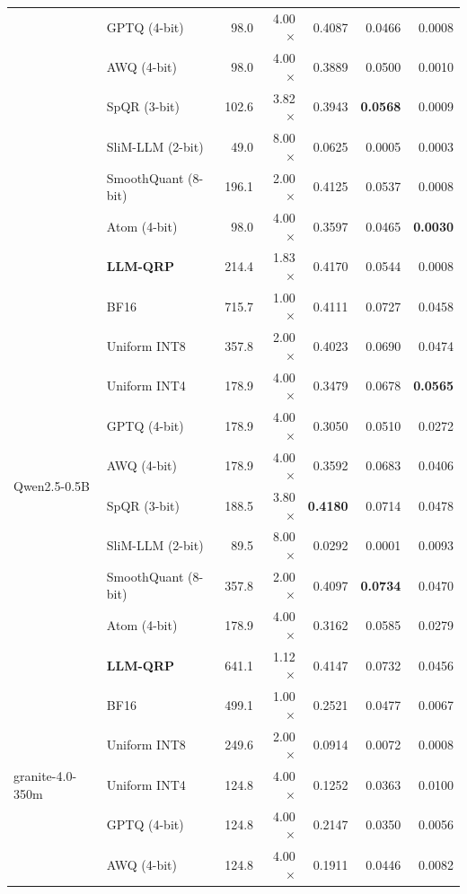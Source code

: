 \documentclass{article}
\begin{document}
\begin{table}[htbp]
\begin{tabular}{@{} l l rr rrr @{}}
     & GPTQ (4-bit) & 98.0 & 4.00$\times$ & 0.4087 & 0.0466 & 0.0008 \\
     & AWQ (4-bit) & 98.0 & 4.00$\times$ & 0.3889 & 0.0500 & 0.0010 \\
     & SpQR (3-bit) & 102.6 & 3.82$\times$ & 0.3943 & \textbf{0.0568} & 0.0009 \\
     & SliM-LLM (2-bit) & 49.0 & 8.00$\times$ & 0.0625 & 0.0005 & 0.0003 \\
     & SmoothQuant (8-bit) & 196.1 & 2.00$\times$ & 0.4125 & 0.0537 & 0.0008 \\
     & Atom (4-bit) & 98.0 & 4.00$\times$ & 0.3597 & 0.0465 & \textbf{0.0030} \\
     & \textbf{LLM-QRP} & 214.4 & 1.83$\times$ & 0.4170 & 0.0544 & 0.0008 \\
    \midrule
    \multirow{10}{*}{Qwen2.5-0.5B}
     & BF16 & 715.7 & 1.00$\times$ & 0.4111 & 0.0727 & 0.0458 \\
     & Uniform INT8 & 357.8 & 2.00$\times$ & 0.4023 & 0.0690 & 0.0474 \\
     & Uniform INT4 & 178.9 & 4.00$\times$ & 0.3479 & 0.0678 & \textbf{0.0565} \\
     & GPTQ (4-bit) & 178.9 & 4.00$\times$ & 0.3050 & 0.0510 & 0.0272 \\
     & AWQ (4-bit) & 178.9 & 4.00$\times$ & 0.3592 & 0.0683 & 0.0406 \\
     & SpQR (3-bit) & 188.5 & 3.80$\times$ & \textbf{0.4180} & 0.0714 & 0.0478 \\
     & SliM-LLM (2-bit) & 89.5 & 8.00$\times$ & 0.0292 & 0.0001 & 0.0093 \\
     & SmoothQuant (8-bit) & 357.8 & 2.00$\times$ & 0.4097 & \textbf{0.0734} & 0.0470 \\
     & Atom (4-bit) & 178.9 & 4.00$\times$ & 0.3162 & 0.0585 & 0.0279 \\
     & \textbf{LLM-QRP} & 641.1 & 1.12$\times$ & 0.4147 & 0.0732 & 0.0456 \\
    \midrule
    \multirow{10}{*}{granite-4.0-350m}
     & BF16 & 499.1 & 1.00$\times$ & 0.2521 & 0.0477 & 0.0067 \\
     & Uniform INT8 & 249.6 & 2.00$\times$ & 0.0914 & 0.0072 & 0.0008 \\
     & Uniform INT4 & 124.8 & 4.00$\times$ & 0.1252 & 0.0363 & 0.0100 \\
     & GPTQ (4-bit) & 124.8 & 4.00$\times$ & 0.2147 & 0.0350 & 0.0056 \\
     & AWQ (4-bit) & 124.8 & 4.00$\times$ & 0.1911 & 0.0446 & 0.0082 \\

\end{tabular}
\end{table}
\end{document}
